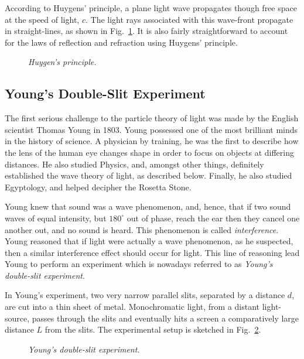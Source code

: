 According to Huygens' principle, a plane light wave propagates though
free space at the speed of light, $c$. The light rays associated with
this wave-front propagate in straight-lines, as shown in Fig.~\ref{f14.3}. It is also fairly straightforward to account for the
laws of reflection and refraction using Huygens' principle.

\begin{figure}
\epsfysize=3in
\centerline{}
\caption{\em Huygen's principle.}\label{f14.3}
\end{figure}

\subsection{Young's Double-Slit Experiment}
The first serious challenge to the particle theory of light was made 
by the English scientist Thomas Young in 1803. Young possessed one of
the most brilliant minds in the history of science. A physician
by training, he was the first to describe how the lens of the human
eye changes shape in order to focus on objects at differing distances.
He also studied Physics, and, amongst other things,
definitely established the wave theory of light, as described
below. Finally, he also studied Egyptology, and helped
decipher the Rosetta Stone.

Young knew that sound was a wave phenomenon, and, hence,  that if two sound
waves of equal intensity, but $180^\circ$ out of phase, reach the ear
then they cancel one another out, and no sound is heard. This phenomenon
is called {\em interference}. Young reasoned that if light were actually
a wave phenomenon, as he suspected, then a similar interference effect
should occur for light. This line of reasoning lead Young to perform
an experiment which is nowadays referred to as {\em Young's double-slit
experiment}. 

In Young's experiment, two very narrow parallel slits, separated by
a distance $d$,  are cut into a
thin sheet  of metal. Monochromatic light, from  a distant light-source, passes
through the slits and eventually hits a screen a comparatively large
distance $L$ from the slits. The experimental setup is sketched
in Fig.~\ref{f14.4}.

\begin{figure}
\epsfysize=3in
\centerline{}
\caption{\em Young's double-slit experiment.}\label{f14.4}
\end{figure}

